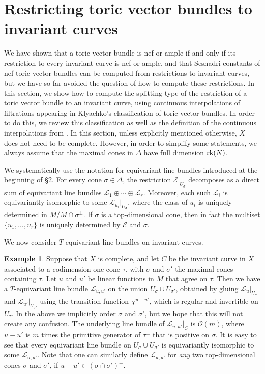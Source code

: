 \documentclass[12pt]{amsart}
\theoremstyle{definition}
\newtheorem{example}[lemma]{Example}
\theoremstyle{remark}
\begin{document}
\section{Restricting toric vector bundles to invariant curves}

We have shown that a toric vector bundle is nef or ample if and only
if its restriction to every invariant curve is nef or ample, and
that Seshadri constants of nef toric vector bundles can be computed
from restrictions to invariant curves, but we have so far avoided
the question of how to compute these restrictions.  In this section,
we show how to compute the splitting type of the restriction of a
toric vector bundle to an invariant curve, using continuous
interpolations of filtrations appearing in Klyachko's classification
of toric vector bundles. In order to do this, we review this
classification as well as the definition of the continuous
interpolations from \cite{Payne}. In this section, unless explicitly
mentioned otherwise, $X$ does not need to be complete. However, in
order to simplify some statements, we always assume that the maximal
cones in $\Delta$ have full dimension ${\rm rk}(N)$.

We systematically use the notation for equivariant line bundles
introduced at the beginning of \S 2.
For every cone $\sigma\in\Delta$, the restriction
${\mathcal{E}}\vert_{U_{\sigma}}$ decomposes as a direct sum of equivariant
line bundles ${\mathcal{L}}_1\oplus\cdots\oplus{\mathcal{L}}_r$. Moreover, each such
${\mathcal{L}}_i$ is equivariantly isomorphic to some
${\mathcal{L}}_{u_i}\vert_{U_{\sigma}}$, where the class of $u_i$ is uniquely
determined in $M/M\cap\sigma^{\perp}$. If $\sigma$ is a
top-dimensional cone, then in fact the multiset $\{u_1,\ldots,u_r\}$
is uniquely determined by ${\mathcal{E}}$ and $\sigma$.

\smallskip

We now consider $T$-equivariant line bundles on invariant curves.

\begin{example}
Suppose that $X$ is complete, and let $C$ be the invariant curve in
$X$ associated to a codimension one cone $\tau$, with $\sigma$
and $\sigma'$ the maximal cones containing $\tau$.  Let $u$ and
$u'$ be linear functions in $M$ that agree on $\tau$.  Then we have
a $T$-equivariant line bundle ${\mathcal{L}}_{u,u'}$ on the union $U_\sigma
\cup U_{\sigma'}$, obtained by gluing ${\mathcal{L}}_{u}\vert_{U_{\sigma}}$
and ${\mathcal{L}}_{u'}\vert_{U_{\sigma'}}$ using the transition function
$\chi^{u-u'}$, which is regular and invertible on $U_\tau$. In the
above we implicitly order $\sigma$ and $\sigma'$, but we hope that
this will not create any confusion.
 The
underlying line bundle of ${\mathcal{L}}_{u,u'}\vert_C$ is ${\mathcal{O}}(m)$, where $u
- u'$ is $m$ times the primitive generator of $\tau^\perp$ that is
positive on $\sigma$. It is easy to see that every equivariant line
bundle on $U_{\sigma} \cup U_{\sigma'}$ is equivariantly isomorphic
to some ${\mathcal{L}}_{u,u'}$. Note that one can similarly define
${\mathcal{L}}_{u,u'}$ for \emph{any} two top-dimensional cones $\sigma$ and
$\sigma'$, if $u-u'\in (\sigma\cap\sigma')^{\perp}$.
\end{example}
\end{document}
